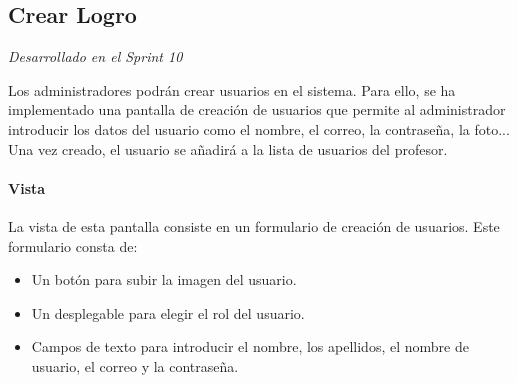 \subsection{Crear Logro} 

\textit{Desarrollado en el Sprint 10}

Los administradores podrán crear usuarios en el sistema. Para ello, se ha implementado una pantalla de creación de usuarios que permite al administrador introducir los datos del usuario como el nombre, el correo, la contraseña, la foto... Una vez creado, el usuario se añadirá a la lista de usuarios del profesor.


\paragraph*{Vista}
La vista de esta pantalla consiste en un formulario de creación de usuarios. Este formulario consta de:
\begin{itemize}
  \item Un botón para subir la imagen del usuario.
  \item Un desplegable para elegir el rol del usuario.
  \item Campos de texto para introducir el nombre, los apellidos, el nombre de usuario, el correo y la contraseña.
\end{itemize}

